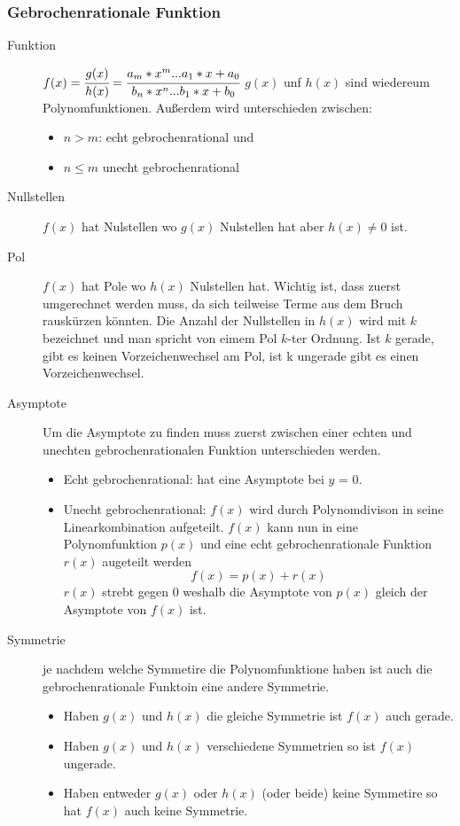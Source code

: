 \documentclass[a4paper]{scrartcl}
\begin{document}
        \subsubsection{Gebrochenrationale Funktion}
        \begin{description}
            \item[Funktion] $f(x) = \cfrac{g(x)}{h(x)}= \cfrac{a_m*x^m...a_1*x + a_0}{b_n*x^n...b_1*x + b_0}$ $g(x)$ unf $h(x)$ sind wiedereum Polynomfunktionen. Außerdem wird unterschieden zwischen:
            \begin{itemize}
                \item $n > m$: echt gebrochenrational und
                \item $n \leq m$ unecht gebrochenrational
            \end{itemize}   
            \item[Nullstellen] $f(x)$ hat Nulstellen wo $g(x)$ Nulstellen hat aber $h(x) \neq 0$ ist.  
            \item[Pol] $f(x)$ hat Pole wo $h(x)$ Nulstellen hat. Wichtig ist, dass zuerst umgerechnet werden muss, da sich teilweise Terme aus dem Bruch rauskürzen könnten.
            Die Anzahl der Nullstellen in $h(x)$ wird mit $k$ bezeichnet und man spricht von eimem Pol $k$-ter Ordnung. Ist $k$
            gerade, gibt es keinen Vorzeichenwechsel am Pol, ist k ungerade gibt es einen Vorzeichenwechsel.
             \item[Asymptote] Um die Asymptote zu finden muss zuerst zwischen einer echten und unechten gebrochenrationalen Funktion unterschieden werden.
                \begin{itemize}
                    \item Echt gebrochenrational: hat eine Asymptote bei $y$ = 0.
                    \item Unecht gebrochenrational: $f(x)$ wird durch Polynomdivison in seine Linearkombination aufgeteilt. $f(x)$ kann nun in eine Polynomfunktion $p(x)$ und
                    eine echt gebrochenrationale Funktion $r(x)$ augeteilt werden  
                    \begin{equation*}
                        f(x) = p(x) + r(x)
                    \end{equation*}
                    $r(x)$ strebt gegen 0 weshalb die Asymptote von $p(x)$ gleich der Asymptote von $f(x)$ ist.
                \end{itemize}
             \item[Symmetrie] je nachdem welche Symmetire die Polynomfunktione haben ist auch die gebrochenrationale Funktoin eine andere Symmetrie. 
                \begin{itemize}
                    \item Haben $g(x)$ und $h(x)$ die gleiche Symmetrie ist $f(x)$ auch gerade.
                    \item Haben $g(x)$ und $h(x)$ verschiedene Symmetrien so ist $f(x)$ ungerade.
                    \item Haben entweder $g(x)$ oder $h(x)$ (oder beide) keine Symmetire so hat $f(x)$ auch keine Symmetrie.
                \end{itemize}  
        \end{description}
\end{document}
